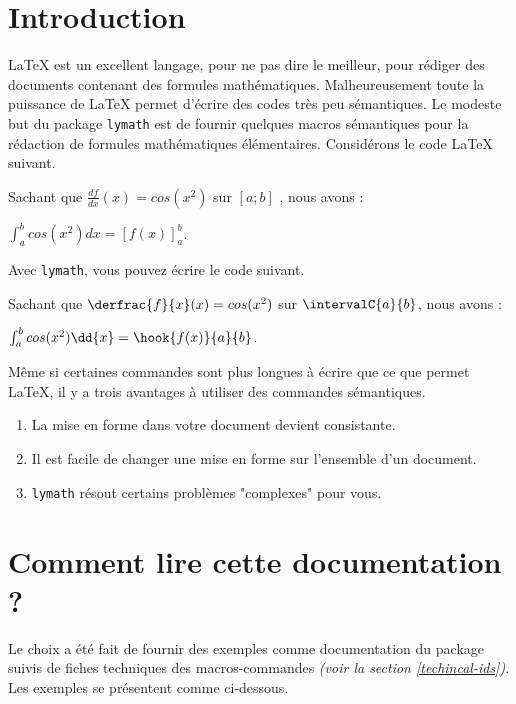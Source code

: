 \documentclass[12pt,a4paper]{article}
\begin{document}
\section{Introduction}

\LaTeX{} est un excellent langage, pour ne pas dire le meilleur, pour rédiger des documents contenant des formules mathématiques.
Malheureusement toute la puissance de \LaTeX{} permet d'écrire des codes très peu sémantiques.
Le modeste but du package \verb+lymath+ est de fournir quelques macros sémantiques pour la rédaction de formules mathématiques élémentaires. Considérons le code \LaTeX{} suivant.

\begin{latexex-alone}
Sachant que $\frac{df}{dx}(x) = cos(x^2)$ sur $[a ; b]$ , nous avons :

$\int_a^b cos(x^2) dx = \left[ f(x) \right]_a^b$.
\end{latexex-alone}


Avec \verb+lymath+, vous pouvez écrire le code suivant.

\begin{latexex-alone}
Sachant que $\derfrac{f}{x}(x) = cos(x^2)$ sur $\intervalC{a}{b}$, nous avons :

$\int_a^b cos(x^2) \dd{x} = \hook{f(x)}{a}{b}$.
\end{latexex-alone}


Même si certaines commandes sont plus longues à écrire que ce que permet \LaTeX{}, il y a trois avantages à utiliser des commandes sémantiques.
\begin{enumerate}
	\item La mise en forme dans votre document devient consistante.

	\item Il est facile de changer une mise en forme sur l'ensemble d'un document.

	\item \verb+lymath+ résout certains problèmes "complexes" pour vous.
\end{enumerate}




\section{Comment lire cette documentation ?}

Le choix a été fait de fournir des exemples comme documentation du package suivis de fiches techniques des macros-commandes \emph{(voir la section \ref{techincal-ids})}. Les exemples se présentent comme ci-dessous.
\end{document}
